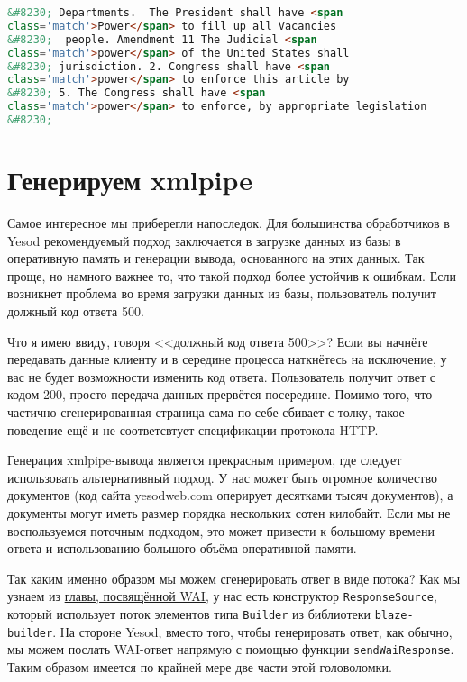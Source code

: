 \begin{lstlisting}[language=HTML]
&#8230; Departments.  The President shall have <span
class='match'>Power</span> to fill up all Vacancies
&#8230;  people. Amendment 11 The Judicial <span
class='match'>power</span> of the United States shall
&#8230; jurisdiction. 2. Congress shall have <span
class='match'>power</span> to enforce this article by
&#8230; 5. The Congress shall have <span
class='match'>power</span> to enforce, by appropriate legislation
&#8230;
\end{lstlisting}

\section{Генерируем xmlpipe} %

Самое интересное мы приберегли напоследок. Для большинства обработчиков в Yesod рекомендуемый подход заключается в загрузке данных из базы в оперативную память и генерации вывода, основанного на этих данных. Так проще, но намного важнее то, что такой подход более устойчив к ошибкам.  Если возникнет проблема во время загрузки данных из базы, пользователь получит должный код ответа 500.

\begin{remark}
  Что я имею ввиду, говоря <<должный код ответа 500>>? Если вы начнёте передавать данные клиенту и в середине процесса наткнётесь на исключение, у вас не будет возможности изменить код ответа. Пользователь получит ответ с кодом 200, просто передача данных прервётся посередине. Помимо того, что частично сгенерированная страница сама по себе сбивает с толку, такое поведение ещё и не соответсвтует спецификации протокола HTTP.
\end{remark}

Генерация xmlpipe-вывода является прекрасным примером, где следует использовать альтернативный подход. У нас может быть огромное количество документов (код сайта yesodweb.com оперирует десятками тысяч документов), а документы могут иметь размер порядка нескольких сотен килобайт. Если мы не воспользуемся поточным подходом, это может привести к большому времени ответа и использованию большого объёма оперативной памяти.

Так каким именно образом мы можем сгенерировать ответ в виде потока? %
Как мы узнаем из \hyperref[chap:web_application_interface]{главы, посвящённой WAI}, у нас есть конструктор \lstinline!ResponseSource!, который использует поток элементов типа \lstinline!Builder! из библиотеки \lstinline'blaze-builder'. На стороне Yesod, вместо того, чтобы генерировать ответ, как обычно, мы можем послать WAI-ответ напрямую с помощью функции \lstinline'sendWaiResponse'. Таким образом имеется по крайней мере две части этой головоломки. %

